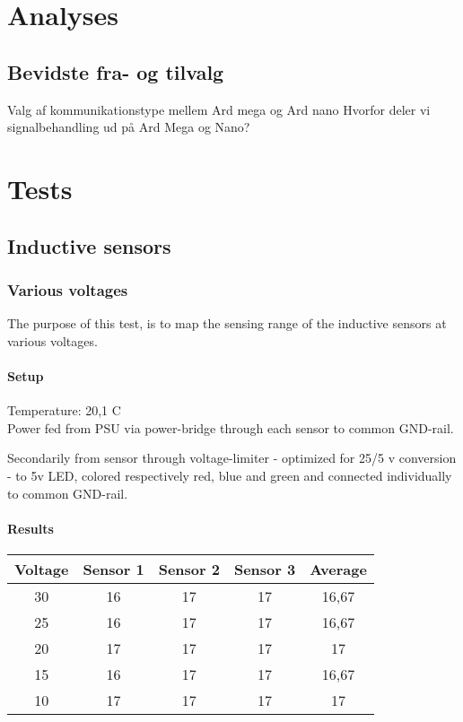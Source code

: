 \chapter{Analyses}

\section{Bevidste fra- og tilvalg}

Valg af kommunikationstype mellem Ard mega og Ard nano
Hvorfor deler vi signalbehandling ud på Ard Mega og Nano?

\chapter{Tests}

\section{Inductive sensors}

\subsection{Various voltages}
The purpose of this test, is to map the sensing range of the inductive sensors at various voltages.

\subsubsection{Setup}
Temperature: 20,1 \textdegree C\\
Power fed from PSU via power-bridge through each sensor to common GND-rail.

Secondarily from sensor through voltage-limiter - optimized for 25/5 v conversion - to 5v LED, colored respectively red, blue and green and connected individually to common GND-rail.

\subsubsection{Results}

\begin{center}
\begin{tabular}{|c|c|c|c|c|}
\hline
    \rowcolor{gray!25}
    Voltage & Sensor 1 & Sensor 2 & Sensor 3 & Average
\\
\hline
    30 & 16 & 17 & 17 & 16,67
\\
\hline
    \rowcolor{gray!25}
    25 & 16 & 17 & 17 & 16,67
\\
\hline
    20 & 17 & 17 & 17 & 17
\\
\hline 
    \rowcolor{gray!25}
    15 & 16 & 17 & 17 & 16,67
\\
\hline
    10 & 17 & 17 & 17 & 17
\\
\hline
\end{tabular}
\end{center}

